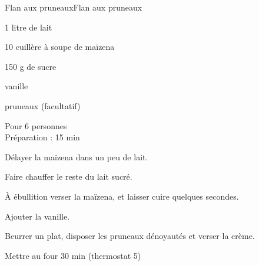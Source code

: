 \begin{recette}{Flan aux pruneaux}{Flan aux pruneaux}

\begin{ingredients}
1 litre de lait\par
10 cuillère à soupe de maïzena\par
150 g de sucre\par
vanille\par
pruneaux (facultatif)\par
\end{ingredients}

\begin{infos}
Pour 6 personnes\\
Préparation : 15 min	\\
\end{infos}

\begin{etapes}
\item Délayer la maïzena dans un peu de lait.
\item Faire chauffer le reste du lait sucré.
\item À ébullition verser la maïzena, et laisser cuire quelques secondes.
\item Ajouter la vanille.
\item Beurrer un plat, disposer les pruneaux dénoyautés et verser la crème.
\item Mettre au four 30 min (thermostat 5)
\end{etapes}

\end{recette}